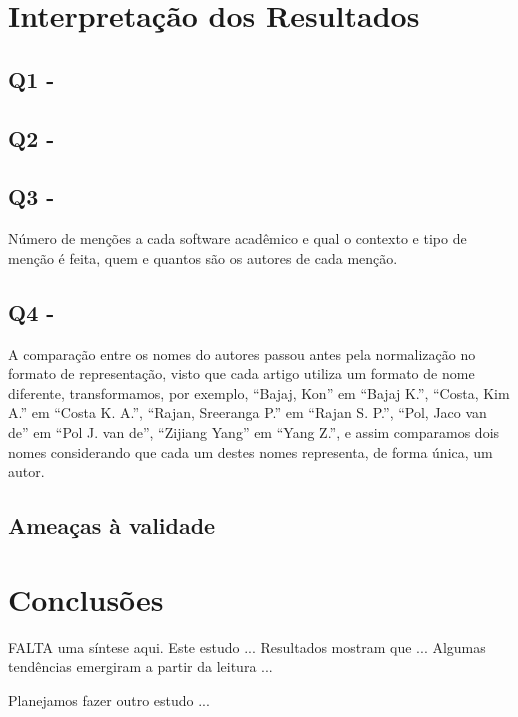 \section{Interpretação dos Resultados} %

\subsection{Q1 - \EstudoDoisQuestaoUm}


\subsection{Q2 - \EstudoDoisQuestaoDois}


\subsection{Q3 - \EstudoDoisQuestaoTres}

Número de menções a cada software acadêmico e qual o contexto e tipo de menção
é feita, quem e quantos são os autores de cada menção.

\subsection{Q4 - \EstudoDoisQuestaoQuatro}

A comparação entre os nomes do autores passou antes pela normalização
no formato de representação, visto que cada artigo utiliza um formato
de nome diferente, transformamos, por exemplo, ``Bajaj, Kon'' em ``Bajaj K.'',
``Costa, Kim A.'' em ``Costa K. A.'', ``Rajan, Sreeranga P.'' em ``Rajan S. P.'',
``Pol, Jaco van de'' em ``Pol J. van de'', ``Zijiang Yang'' em ``Yang Z.'',
e assim comparamos dois nomes considerando que cada um destes nomes representa,
de forma única, um autor.

\subsection{Ameaças à validade}

\section{Conclusões}

FALTA uma síntese aqui. 
Este estudo ...
Resultados mostram que ...
Algumas tendências emergiram a partir da leitura ...

Planejamos fazer outro estudo ... 



